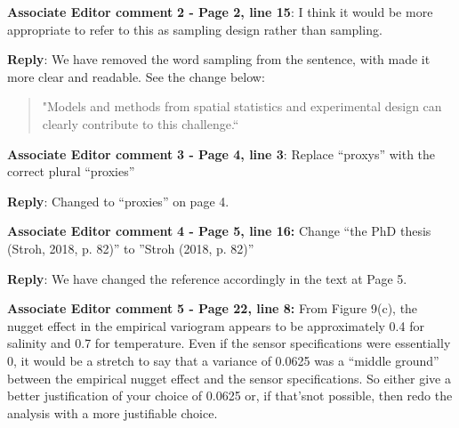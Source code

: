 \documentclass[a4paper]{article}
\def\aecom{\textbf{Associate Editor comment }}
\def\reply{\textbf{Reply}}
\begin{document}
\vspace{5mm}
\noindent \aecom \textbf{2 - Page 2, line 15}:  I think it would be more appropriate to refer to this as sampling design rather than sampling.

\vspace{5mm}
\reply: We have removed the word sampling from the sentence, with made it more clear and readable. See the change below:

\begin{quote}
    "Models and methods from spatial statistics and experimental design can clearly contribute to this challenge.``
\end{quote}

\vspace{5mm}
\noindent \aecom \textbf{3 - Page 4, line 3}:  Replace “proxys” with the correct plural “proxies”

\vspace{5mm}
\reply: Changed to “proxies” on page 4.

\vspace{5mm}
\noindent \aecom \textbf{4 - Page 5, line 16:}  Change  “the  PhD  thesis  (Stroh,  2018,  p.  82)”  to ”Stroh (2018, p. 82)”

\vspace{5mm}
\reply: We have changed the reference accordingly in the text at Page 5. 

\vspace{5mm}
\noindent \aecom \textbf{5 - Page 22, line 8:}  From Figure 9(c), the nugget effect in the empirical variogram appears to be approximately 0.4 for salinity and 0.7 for temperature.  Even if the sensor specifications were essentially 0, it would be a stretch to say that a variance of 0.0625 was a “middle ground” between the empirical nugget effect and the sensor specifications.  So either give a better justification of your choice of 0.0625 or, if that’snot possible, then redo the analysis with a more justifiable choice.
\end{document}
